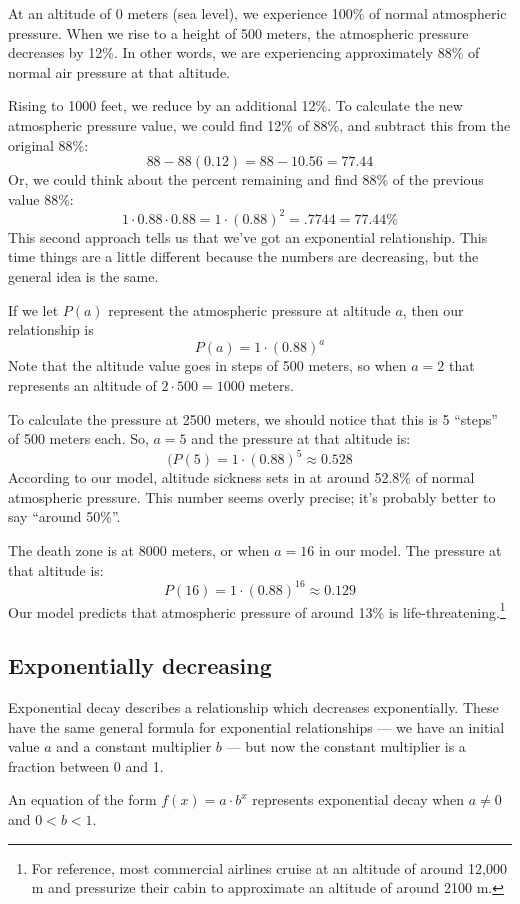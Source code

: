 At an altitude of 0 meters (sea level), we experience 100\% of normal atmospheric pressure. When we rise to a height of 500 meters, the atmospheric pressure decreases by 12\%. In other words, we are experiencing approximately 88\% of normal air pressure at that altitude.

Rising to 1000 feet, we reduce by an additional 12\%. To calculate the new atmospheric pressure value, we could find 12\% of 88\%, and subtract this from the original 88\%:
\[88 - 88(0.12) = 88 - 10.56 = 77.44\]
Or, we could think about the percent remaining and find 88\% of the previous value 88\%:
\[1\cdot0.88\cdot0.88 = 1\cdot(0.88)^2 = .7744 = 77.44\%\]
This second approach tells us that we've got an exponential relationship. This time things are a little different because the numbers are decreasing, but the general idea is the same.

If we let $P(a)$ represent the atmospheric pressure at altitude $a$, then our relationship is
\[P(a) = 1 \cdot (0.88)^a\]
Note that the altitude value goes in steps of 500 meters, so when $a=2$ that represents an altitude of $2\cdot500 = 1000$ meters.

To calculate the pressure at 2500 meters, we should notice that this is 5 ``steps'' of 500 meters each. So, $a=5$ and the pressure at that altitude is:
\[(P(5) = 1\cdot(0.88)^5 \approx 0.528\]
According to our model, altitude sickness sets in at around 52.8\% of normal atmospheric pressure. This number seems overly precise; it's probably better to say ``around 50\%''.

The death zone is at 8000 meters, or when $a=16$ in our model. The pressure at that altitude is:
\[P(16) = 1\cdot(0.88)^{16} \approx 0.129\]
Our model predicts that atmospheric pressure of around 13\% is life-threatening.\footnote{For reference, most commercial airlines cruise at an altitude of around 12,000 m and pressurize their cabin to approximate an altitude of around 2100 m.}

\subsection{Exponentially decreasing}

Exponential decay describes a relationship which decreases exponentially. These have the same general formula for exponential relationships --- we have an initial value $a$ and a constant multiplier $b$ --- but now the constant multiplier is a fraction between 0 and 1.

\begin{boxdef}
An equation of the form $f(x) = a \cdot b^x$ represents exponential decay when $a \neq 0$ and $0 < b < 1$.
\end{boxdef}

